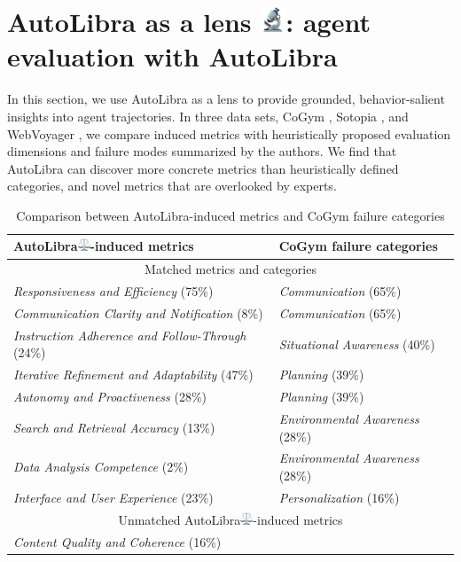 \section{\texorpdfstring{AutoLibra as a lens \includegraphics[height=1em]{figs/microscope.png}: agent evaluation with AutoLibra}{AutoLibra as a lens: agent evaluation with AutoLibra}}
\label{sec:lens}

In this section, we use AutoLibra as a lens to provide grounded, behavior-salient insights into agent trajectories. In three data sets, CoGym \citep{shao2024collaborative}, Sotopia \citep{zhousotopia}, and WebVoyager \citep{he2024webvoyager}, we compare induced metrics with heuristically proposed evaluation dimensions and failure modes summarized by the authors. We find that AutoLibra can discover more concrete metrics than heuristically defined categories, and novel metrics that are overlooked by experts. 

\begin{table}[!h]
\centering
\begin{tabular}{ll}
    \toprule
    AutoLibra\protect\includegraphics[height=1em]{figs/scale.png}-induced metrics & CoGym failure categories\\\midrule
    \multicolumn{2}{c}{Matched metrics and categories}\\\midrule
    \textit{Responsiveness and Efficiency} (75\%) & \textit{Communication} (65\%) \\
    \emph{Communication Clarity and Notification} (8\%) & \textit{Communication} (65\%)\\
    \textit{Instruction Adherence and Follow-Through} (24\%) & \textit{Situational Awareness} (40\%)\\
    \textit{Iterative Refinement and Adaptability} (47\%) & \textit{Planning} (39\%)\\
    \textit{Autonomy and Proactiveness} (28\%) & \textit{Planning} (39\%) \\
    \textit{Search and Retrieval Accuracy} (13\%) & \textit{Environmental Awareness} (28\%) \\
    \textit{Data Analysis Competence} (2\%) & \textit{Environmental Awareness} (28\%) \\
    \textit{Interface and User Experience} (23\%) & \textit{Personalization} (16\%) \\\midrule
    \multicolumn{2}{c}{Unmatched AutoLibra\protect\includegraphics[height=1em]{figs/scale.png}-induced metrics}\\\midrule
     \multicolumn{2}{C{0.8\textwidth}}{\textit{Content Quality and Coherence} (16\%)} \\ \bottomrule
\end{tabular}
\caption{Comparison between AutoLibra-induced metrics and CoGym failure categories}
\label{tab:lens_cogym}
\end{table}

